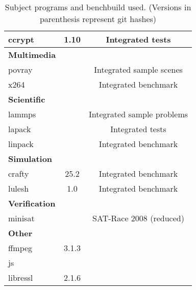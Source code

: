 \begin{table}[H]
{\begin{minipage}{\textwidth}
\begin{tabularx}{\textwidth}{lcC}
                ccrypt & 1.10 & Integrated tests\\
                \midrule
                \textbf{Multimedia}\\
                povray &  & Integrated sample scenes\\
                x264 &  & Integrated benchmark\\
                \midrule
                \textbf{Scientific}\\
                lammps &  & Integrated sample problems\\
                lapack & & Integrated tests\\
                linpack & & Integrated benchmark\\
                \midrule
                \textbf{Simulation}\\
                crafty & 25.2 & Integrated benchmark\\
                lulesh & 1.0 & Integrated benchmark\\
                \midrule
                \textbf{Verification}\\
                minisat &  & SAT-Race 2008 (reduced)\\
                \midrule
                \textbf{Other}\\
                ffmpeg & 3.1.3\\
                js\\
                libressl & 2.1.6\\
                \bottomrule
            \end{tabularx}
            \caption[Subject programs]{Subject programs and benchbuild used. (Versions in parenthesis represent git hashes)}
            \label{tab:subjectPrograms}
        \end{minipage}
    }
\end{table}

